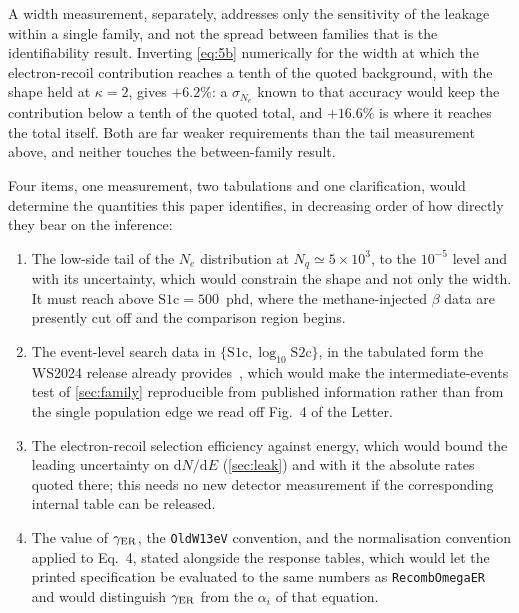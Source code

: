 \documentclass[11pt,a4paper]{article}
\begin{document}
A width measurement, separately, addresses only the sensitivity of the
leakage within a single family, and not the spread between families that
is the identifiability result. Inverting \cref{eq:5b} numerically for
the width at which the electron-recoil contribution reaches a tenth of
the quoted background, with the shape held at \(\kappa=2\), gives
\(+6.2\%\): a
\(\sigma_{N_e}\) known to that accuracy would keep the contribution
below a tenth of the quoted total, and \(+16.6\%\) is where it reaches
the total itself. Both are far weaker requirements than the tail
measurement above, and neither touches the between-family result.

Four items, one measurement, two tabulations and one clarification,
would determine the quantities this paper identifies, in decreasing
order of how directly they bear on the inference:

\begin{enumerate}
\item The low-side tail of the \(N_e\) distribution at
    \(N_q\simeq5\times10^{3}\), to the \(10^{-5}\) level and with its
    uncertainty, which would constrain the shape and not only the width.
    It must reach above \(\mathrm{S1c}=500\)~phd, where the
    methane-injected \(\beta\) data are presently cut off and the
    comparison region begins.
\item The event-level search data in
    \(\{\mathrm{S1c},\log_{10}\mathrm{S2c}\}\), in the tabulated form
    the WS2024 release already provides~\cite{WS2024}, which would make
    the intermediate-events test of \cref{sec:family} reproducible from
    published information rather than from the single population edge we
    read off Fig.~4 of the Letter.
\item The electron-recoil selection efficiency against energy, which
    would bound the leading uncertainty on \(\mathrm{d}N/\mathrm{d}E\)
    (\cref{sec:leak}) and with it the absolute rates quoted there; this
    needs no new detector measurement if the corresponding internal
    table can be released.
\item The value of \(\gamma_{\rm ER}\), the \texttt{OldW13eV}
    convention, and the normalisation convention applied to Eq.~4,
    stated alongside the response tables, which would let the printed
    specification be evaluated to the same numbers as
    \texttt{RecombOmegaER} and would distinguish \(\gamma_{\rm ER}\)
    from the \(\alpha_i\) of that equation.
\end{enumerate}
\end{document}
